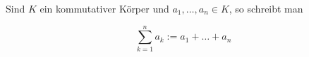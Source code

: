 Sind $K$ ein kommutativer Körper und $a_1, \dots, a_n \in K$, so schreibt man

$$\sum_{k=1}^n a_k := a_1 + \dots + a_n$$